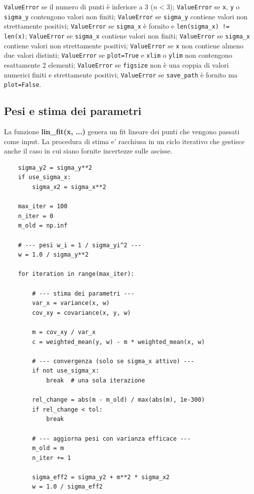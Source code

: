 \begin{apidesc}
    \texttt{ValueError} se il numero di punti è inferiore a 3 ($n < 3$);
    \texttt{ValueError} se \texttt{x}, \texttt{y} o \texttt{sigma\_y} contengono valori non finiti;
    \texttt{ValueError} se \texttt{sigma\_y} contiene valori non strettamente positivi;
    \texttt{ValueError} se \texttt{sigma\_x} \`e fornito e \texttt{len(sigma\_x) != len(x)};
    \texttt{ValueError} se \texttt{sigma\_x} contiene valori non finiti;
    \texttt{ValueError} se \texttt{sigma\_x} contiene valori non strettamente positivi;
    \texttt{ValueError} se \texttt{x} non contiene almeno due valori distinti;
    \texttt{ValueError} se \texttt{plot=True} e \texttt{xlim} o \texttt{ylim} non contengono esattamente 2 elementi;
    \texttt{ValueError} se \texttt{figsize} non è una coppia di valori numerici finiti e strettamente positivi;
    \texttt{ValueError} se \texttt{save\_path} è fornito ma \texttt{plot=False}.
\end{apidesc}




\subsection{Pesi e stima dei parametri}

La funzione \textbf{lin\_fit(x, ...)} genera un fit lineare dei punti che vengono passati come input. La procedura di stima e' racchiusa in un ciclo iterativo che gestisce anche il caso in cui siano fornite incertezze sulle ascisse.

\begin{verbatim}
    sigma_y2 = sigma_y**2
    if use_sigma_x:
        sigma_x2 = sigma_x**2

    max_iter = 100
    n_iter = 0
    m_old = np.inf

    # --- pesi w_i = 1 / sigma_yi^2 ---
    w = 1.0 / sigma_y**2

    for iteration in range(max_iter):

        # --- stima dei parametri ---
        var_x = variance(x, w)
        cov_xy = covariance(x, y, w)

        m = cov_xy / var_x
        c = weighted_mean(y, w) - m * weighted_mean(x, w)

        # --- convergenza (solo se sigma_x attivo) ---
        if not use_sigma_x:
            break  # una sola iterazione

        rel_change = abs(m - m_old) / max(abs(m), 1e-300)
        if rel_change < tol:
            break

        # --- aggiorna pesi con varianza efficace ---
        m_old = m
        n_iter += 1

        sigma_eff2 = sigma_y2 + m**2 * sigma_x2
        w = 1.0 / sigma_eff2
\end{verbatim}

